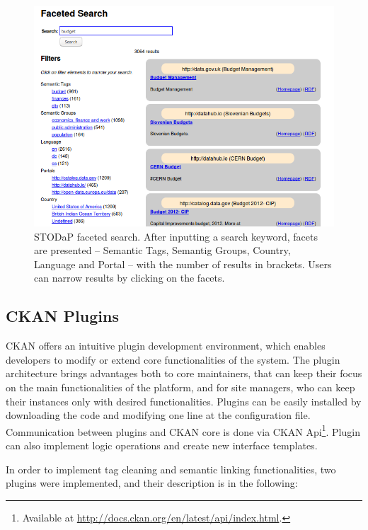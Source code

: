 \begin{figure}[h]
\begin{center}
\includegraphics[width=\columnwidth]{images/stodapscreen_search.png}
\caption[STODaP faceted search.]{STODaP faceted search. After inputting a search keyword, facets are presented -- Semantic Tags, Semantig Groups, Country, Language and Portal -- with the number of results in brackets. Users can narrow results by clicking on the facets.}
\label{fig:stodap_search}
\end{center}
\end{figure}

\subsection{CKAN Plugins}
\label{sec:implem_plugins}

CKAN offers an intuitive plugin development environment, which enables developers to modify or extend core functionalities of the system.
The plugin architecture brings advantages both to core maintainers, that can keep their focus on the main functionalities of the platform, and for site managers, who can keep their instances only with desired functionalities.
Plugins can be easily installed by downloading the code and modifying one line at the configuration file.
Communication between plugins and CKAN core is done via CKAN Api\footnote{Available at \url{http://docs.ckan.org/en/latest/api/index.html}.}.
Plugin can also implement logic operations and create new interface templates.

In order to implement tag cleaning and semantic linking functionalities, two plugins were implemented, and their description is in the following:

